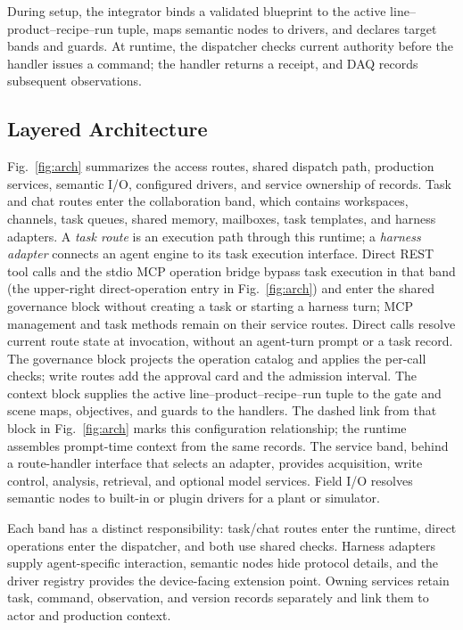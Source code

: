 During setup, the integrator binds a validated blueprint to the active
line--product--recipe--run tuple, maps semantic nodes to drivers, and declares
target bands and guards. At runtime, the dispatcher checks current authority
before the handler issues a command; the handler returns a receipt, and DAQ
records subsequent observations.

\subsection{Layered Architecture}
\label{sec:layers}
\label{sec:arch}
Fig.~\ref{fig:arch} summarizes the access routes, shared dispatch path,
production services, semantic I/O, configured drivers, and service ownership
of records. Task and chat routes enter the
collaboration band, which contains workspaces, channels, task queues, shared
memory, mailboxes, task templates, and harness adapters. A \emph{task route}
is an execution path through this runtime; a \emph{harness adapter} connects
an agent engine to its task execution interface. Direct REST tool
calls and the stdio MCP operation bridge bypass task execution in that band
(the upper-right direct-operation entry in
Fig.~\ref{fig:arch}) and enter the shared governance block without creating a
task or starting a harness turn; MCP management and task methods remain on
their service routes. Direct calls resolve current route state at invocation,
without an agent-turn prompt or a task record.
The governance block projects the operation catalog and applies the per-call
checks; write routes add the approval card and the admission interval. The
context block supplies the active line--product--recipe--run tuple to the gate
and scene maps, objectives, and guards to the handlers. The dashed link from
that block in Fig.~\ref{fig:arch} marks this configuration relationship; the
runtime assembles prompt-time context from the same records. The service band,
behind a route-handler interface that selects an adapter, provides
acquisition, write control, analysis, retrieval, and optional model services.
Field I/O resolves semantic nodes to built-in or plugin drivers for a plant or
simulator.

Each band has a distinct responsibility: task/chat routes enter the runtime,
direct operations enter the dispatcher, and both use shared checks. Harness
adapters supply agent-specific interaction, semantic nodes hide protocol
details, and the driver registry provides the device-facing extension point.
Owning services retain task, command, observation, and version records
separately and link them to actor and production context.

